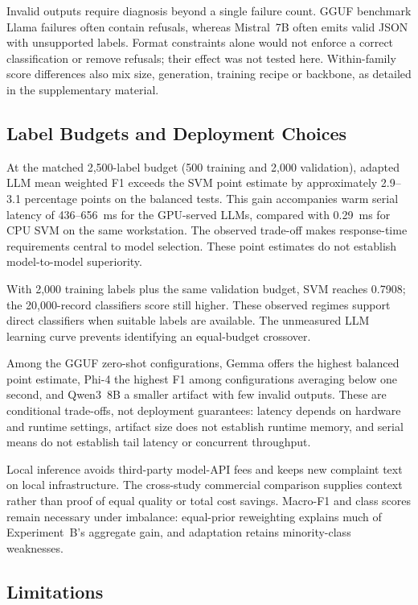 \documentclass[pdflatex,sn-mathphys-num]{sn-jnl}
\begin{document}
Invalid outputs require diagnosis beyond a single failure count.
GGUF benchmark Llama failures often contain refusals, whereas Mistral~7B
often emits valid JSON with unsupported labels. Format constraints
alone would not enforce a correct classification or remove refusals;
their effect was not tested here. Within-family score differences
also mix size, generation, training recipe or backbone, as detailed
in the supplementary material.

\subsection{Label Budgets and Deployment Choices}

At the matched 2,500-label budget (500 training and 2,000 validation),
adapted LLM mean weighted F1 exceeds the SVM point estimate by
approximately 2.9--3.1 percentage points on the balanced tests.
This gain accompanies warm serial latency of 436--656~ms for the
GPU-served LLMs, compared with 0.29~ms for CPU SVM on the same
workstation. The observed trade-off makes response-time requirements
central to model selection. These point estimates do not establish
model-to-model superiority.

With 2,000 training labels plus the same validation budget,
SVM reaches 0.7908; the 20,000-record classifiers
score still higher. These observed regimes support direct classifiers
when suitable labels are available. The unmeasured LLM learning
curve prevents identifying an equal-budget crossover.

Among the GGUF zero-shot configurations, Gemma offers the highest
balanced point estimate, Phi-4 the highest F1 among configurations
averaging below one second, and Qwen3~8B a smaller artifact with few
invalid outputs. These are conditional trade-offs, not deployment
guarantees: latency depends on hardware and runtime settings,
artifact size does not establish runtime memory, and serial means do
not establish tail latency or concurrent throughput.

Local inference avoids third-party model-API fees and keeps new
complaint text on local infrastructure. The cross-study commercial
comparison supplies context rather than proof of equal quality or
total cost savings. Macro-F1 and class scores remain necessary under
imbalance: equal-prior reweighting explains much of Experiment~B's
aggregate gain, and adaptation retains minority-class weaknesses.

\subsection{Limitations}
\end{document}
